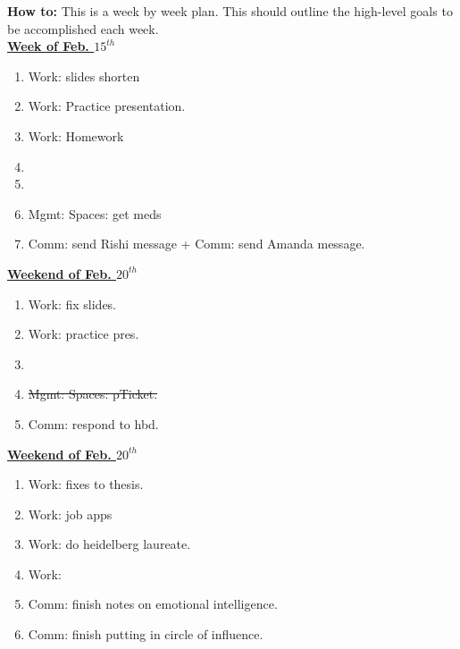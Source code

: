 \documentclass[11pt]{article}
\newcommand{\doneTask}[1]{\item \sout{\small #1}}
\begin{document}
\newpage 
\textbf{How to:} This is a week by week plan. This should outline the high-level goals to be accomplished each week.  \\


           {\small \underline{\textbf{Week of Feb. $15^{th}$}}}\\
           \begin{enumerate}
           \item \small Work: slides shorten  
           \item \small Work: Practice presentation. 
           \item \small Work: Homework 
           \item \small 
           \item \small 

           \item \small Mgmt: Spaces: get meds  


           \item \small Comm: send Rishi message + Comm: send Amanda message. 
           \end{enumerate}   

           {\small \underline{\textbf{Weekend of Feb. $20^{th}$}}}\\
           \begin{enumerate}
           \item \small Work: fix slides.  
           \item \small Work: practice pres. 
             
           \item \small \doneTask{Mgmt: Spaces: pTicket.} 
           
           \item \small Comm: respond to hbd. 
           \end{enumerate}


           {\small \underline{\textbf{Weekend of Feb. $20^{th}$}}}\\
           \begin{enumerate} 
             \small \item \small Work: fixes to thesis. 
           \small \item \small Work: job apps
           \item \small  Work: do heidelberg laureate. 
           \item \small  Work: 

           \item \small Comm: finish notes on emotional intelligence. 
           \item \small Comm: finish putting in circle of influence. 
           \end{enumerate}
\end{document}
